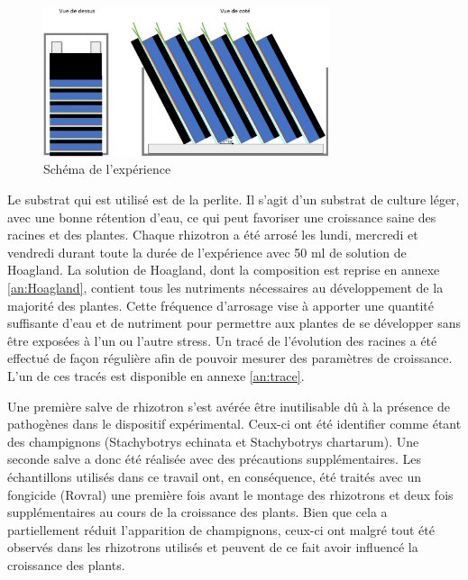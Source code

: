 \begin{figure}[ht]
\centering
\includegraphics[width=0.75\textwidth]{Image/montage.png}
\caption{Schéma de l'expérience}
\label{fig:montage}
\end{figure}

Le substrat qui est utilisé est de la perlite.
Il s'agit d'un substrat de culture léger, avec une bonne rétention d'eau, ce qui peut favoriser une croissance saine des racines et des plantes.
Chaque rhizotron a été arrosé les lundi, mercredi et vendredi durant toute la durée de l'expérience avec 50 ml de solution de Hoagland.
La solution de Hoagland, dont la composition est reprise en annexe \ref{an:Hoagland}, contient tous les nutriments nécessaires au développement de la majorité des plantes.
Cette fréquence d'arrosage vise à apporter une quantité suffisante d'eau et de nutriment pour permettre aux plantes de se développer sans être exposées à l'un ou l'autre stress.
Un tracé de l'évolution des racines a été effectué de façon régulière afin de pouvoir mesurer des paramètres de croissance.
L'un de ces tracés est disponible en annexe \ref{an:trace}.
\newline

Une première salve de rhizotron s'est avérée être inutilisable dû à la présence de pathogènes dans le dispositif expérimental.
Ceux-ci ont été identifier comme étant des champignons (Stachybotrys echinata et Stachybotrys chartarum).
Une seconde salve a donc été réalisée avec des précautions supplémentaires.
Les échantillons utilisés dans ce travail ont, en conséquence, été traités avec un fongicide (Rovral) une première fois avant le montage des rhizotrons et deux fois supplémentaires au cours de la croissance des plants.
Bien que cela a partiellement réduit l'apparition de champignons, ceux-ci ont malgré tout été observés dans les rhizotrons utilisés et peuvent de ce fait avoir influencé la croissance des plants.

